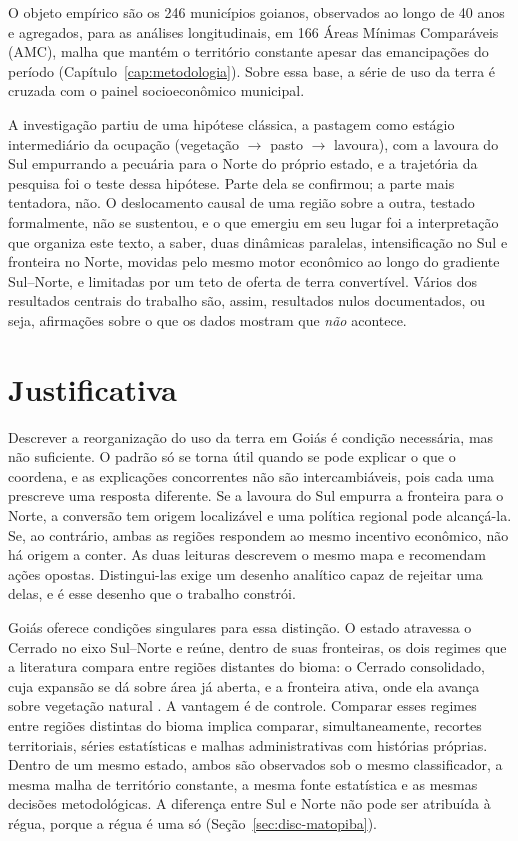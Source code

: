 O objeto empírico são os 246 municípios goianos, observados ao longo de 40
anos e agregados, para as análises longitudinais, em 166 Áreas Mínimas
Comparáveis (AMC), malha que mantém o território constante apesar das
emancipações do período (Capítulo~\ref{cap:metodologia}). Sobre essa base,
a série de uso da terra é cruzada com o painel socioeconômico municipal.

A investigação partiu de uma hipótese clássica, a pastagem como estágio
intermediário da ocupação (vegetação $\to$ pasto $\to$ lavoura), com a lavoura
do Sul empurrando a pecuária para o Norte do próprio estado, e a trajetória da
pesquisa foi o teste dessa hipótese. Parte dela se confirmou; a parte mais
tentadora, não. O deslocamento causal de uma região sobre a outra, testado
formalmente, não se sustentou, e o que emergiu em seu lugar foi a
interpretação que organiza este texto, a saber, duas dinâmicas paralelas,
intensificação no Sul e fronteira no Norte, movidas pelo mesmo motor econômico
ao longo do gradiente Sul--Norte, e limitadas por um teto de oferta de terra
convertível. Vários dos resultados centrais do trabalho são, assim, resultados
nulos documentados, ou seja, afirmações sobre o que os dados mostram que \emph{não}
acontece.

\section{Justificativa}
\label{sec:intro-justificativa}

Descrever a reorganização do uso da terra em Goiás é condição necessária, mas
não suficiente. O padrão só se torna útil quando se pode explicar o que o
coordena, e as explicações concorrentes não são intercambiáveis, pois cada uma
prescreve uma resposta diferente. Se a lavoura do Sul empurra a fronteira para
o Norte, a conversão tem origem localizável e uma política regional pode
alcançá-la. Se, ao contrário, ambas as regiões respondem ao mesmo incentivo
econômico, não há origem a conter. As duas leituras descrevem o mesmo mapa e
recomendam ações opostas. Distingui-las exige um desenho analítico capaz de
rejeitar uma delas, e é esse desenho que o trabalho constrói.

Goiás oferece condições singulares para essa distinção. O estado atravessa o
Cerrado no eixo Sul--Norte e reúne, dentro de suas fronteiras, os dois regimes
que a literatura compara entre regiões distantes do bioma: o Cerrado
consolidado, cuja expansão se dá sobre área já aberta, e a fronteira ativa,
onde ela avança sobre vegetação natural \cite{CarneiroFilho2016}. A vantagem é
de controle. Comparar esses regimes entre regiões distintas do bioma implica
comparar, simultaneamente, recortes territoriais, séries estatísticas e malhas
administrativas com histórias próprias. Dentro de um mesmo estado, ambos são
observados sob o mesmo classificador, a mesma malha de território constante, a
mesma fonte estatística e as mesmas decisões metodológicas. A diferença entre
Sul e Norte não pode ser atribuída à régua, porque a régua é uma só
(Seção~\ref{sec:disc-matopiba}).

